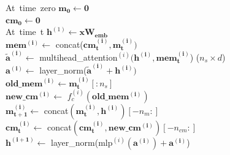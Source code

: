 \begin{algorithm}
    \caption{Compressive Transformer}
    \label{alg:model}
    \begin{algorithmic}[1] 
    \hbox{At time zero}
    \STATE $\mathbf{m_0} \leftarrow \mathbf{0}$  \\
    \STATE $\mathbf{cm_0} \leftarrow \mathbf{0}$  \\
    \hbox{At time t}
    \STATE $\mathbf{h}^{(1)} \leftarrow \mathbf{x} \mathbf{W_{emb}}$  \\
        \STATE $\mathbf{mem^{(i)}} \leftarrow $ \hbox{concat}($\mathbf{cm_t^{(i)}}, \mathbf{m_t^{(i)}})$     \\
        \STATE $\mathbf{\tilde{a}^{(i)}} \leftarrow$ \hbox{multihead\_attention}$^{(i)}(\mathbf{h^{(i)}}, \mathbf{mem_t^{(i)}}$)  ($n_s \times d$)\\
        \STATE $\mathbf{a^{(i)}} \leftarrow $ \hbox{layer\_norm}($\mathbf{\tilde{a}^{(i)}} + \mathbf{h^{(i)}})$ \\
        \STATE $\mathbf{old\_mem^{(i)}} \leftarrow \mathbf{m_t^{(i)}}[:n_s]$ \\
        \STATE $\mathbf{new\_cm^{(i)}} \leftarrow $ $f^{(i)}_c(\mathbf{old\_mem^{(i)}})$  \\
        \STATE $\mathbf{m_{t+1}^{(i)}} \leftarrow $ \hbox{concat}$(\mathbf{m_t^{(i)}}, \mathbf{h^{(i)}})[-n_m:]$ \\
        \STATE $\mathbf{cm_t^{(i)}} \leftarrow $ \hbox{concat}$(\mathbf{cm_t^{(i)}}, \mathbf{new\_cm^{(i)}})[-n_{cm}:]$  \\
        \STATE $\mathbf{h^{(i + 1)}} \leftarrow $ \hbox{layer\_norm(mlp}$^{(i)}(\mathbf{a^{(i)}}) + \mathbf{a^{(i)}}$) \\
    \ENDFOR 
    \end{algorithmic}
\end{algorithm}

